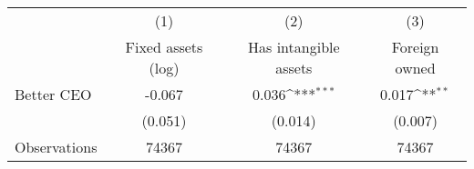 {
\def\sym#1{\ifmmode^{#1}\else\(^{#1}\)\fi}
\begin{tabular}{l*{3}{c}}
\hline\hline
                    &\multicolumn{1}{c}{(1)}&\multicolumn{1}{c}{(2)}&\multicolumn{1}{c}{(3)}\\
                    &\multicolumn{1}{c}{Fixed assets (log)}&\multicolumn{1}{c}{Has intangible assets}&\multicolumn{1}{c}{Foreign owned}\\
\hline
Better CEO          &      -0.067         &       0.036\sym{***}&       0.017\sym{**} \\
                    &     (0.051)         &     (0.014)         &     (0.007)         \\
\hline
Observations        &       74367         &       74367         &       74367         \\
\hline\hline
\end{tabular}
}

